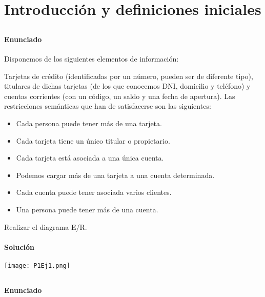 \chapter{Introducción y definiciones iniciales}

\section{}\label{ej1-1}

\subsubsection{Enunciado}

Disponemos de los siguientes elementos de información:

Tarjetas de crédito (identificadas por un número, pueden ser de diferente tipo), titulares de dichas tarjetas (de los que conocemos DNI, domicilio y teléfono) y cuentas corrientes (con un código, un saldo y una fecha de apertura).
Las restricciones semánticas que han de satisfacerse son las siguientes:

\begin{itemize}
	\item Cada persona puede tener más de una tarjeta.
	\item Cada tarjeta tiene un único titular o propietario.
	\item Cada tarjeta está asociada a una única cuenta.
	\item Podemos cargar más de una tarjeta a una cuenta determinada.
	\item Cada cuenta puede tener asociada varios clientes.
	\item Una persona puede tener más de una cuenta.
\end{itemize}

Realizar el diagrama E/R.

\subsubsection{Solución}

\begin{center}
	\texttt{[image: P1Ej1.png]}
\end{center}

\section{}\label{ej1-2}

\subsubsection{Enunciado}

